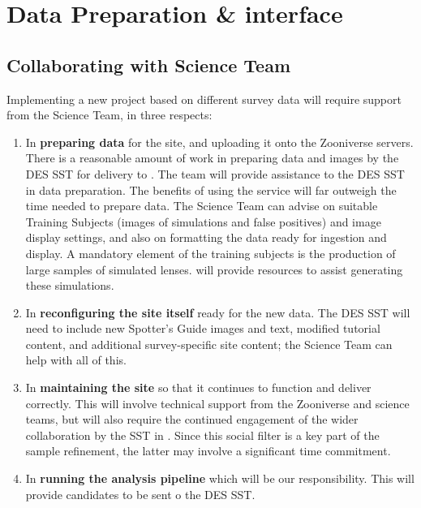\documentclass[a4paper,twocolumn]{article}
\begin{document}

\section{Data Preparation \& \SW interface}
\label{sec:data}

\subsection{Collaborating with \SW Science Team}

Implementing a new project based on different survey data will require support from the \SW Science Team, in three respects: 

\begin{enumerate}

\item In {\bf preparing data} for the site, and uploading it onto the
Zooniverse servers. There is a reasonable amount of work in preparing data and images by the DES SST for delivery to \SW. The \SW team will provide assistance to the DES SST in data preparation. The benefits of using the \SW service will far outweigh the time needed to prepare data.  The \SW Science Team can advise on suitable Training
Subjects (images of simulations and false positives) and image display settings, and also on formatting the data
ready for ingestion and display. A mandatory element of the training subjects is the production of large samples of simulated lenses. \SW will provide resources to assist generating these simulations. 

\item In {\bf reconfiguring the site itself} ready for the new data. The DES
SST will need to include new Spotter's Guide images and text,
modified tutorial content, and additional survey-specific site content;
the \SW Science Team can help with all of this.

\item In {\bf maintaining the site} so that it continues to function and deliver
correctly. This will involve technical support from the Zooniverse and \SW science teams,
but will also require the continued engagement of the wider
collaboration by the SST in \Talk. Since this social filter is
a key part of the sample refinement, the latter may involve a
significant time commitment.

\item In {\bf running the \SW analysis pipeline} which will be our responsibility. This will provide candidates to be sent o the DES SST.

\end{enumerate}
\end{document}
